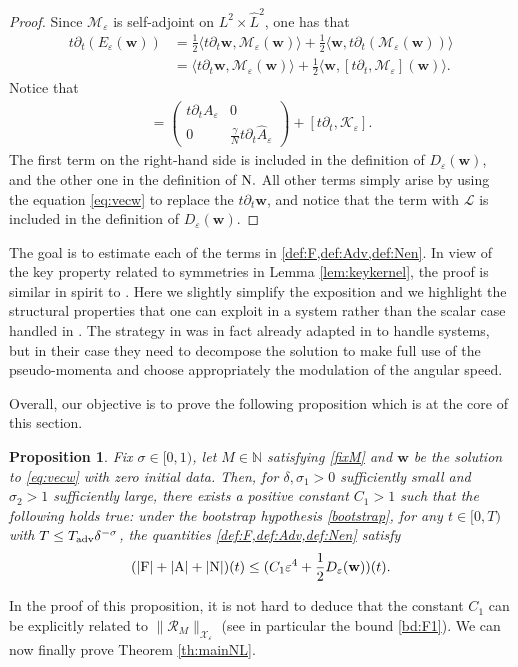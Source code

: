 \documentclass[11pt,reqno,a4paper]{amsart}
\def\eps{\varepsilon}
\def\de{{\partial}}
\def\NN {\mathbb{N}}
\newcommand{\cK}{\mathcal{K}}
\newcommand{\cL}{\mathcal{L}}
\newcommand{\cM}{\mathcal{M}}
\newcommand{\cR}{\mathcal{R}}
\newcommand{\cX}{\mathcal{X}}
\newcommand{\1}{\mathbbm{1}}
\newtheorem{proposition}{Proposition}[section]
\theoremstyle{definition}
\theoremstyle{definition}
\numberwithin{equation}{section}
\begin{document}
\begin{proof}
    Since $\cM_{\eps}$ is self-adjoint on $L^2\times \widehat{L}^2$, one has that 
    \begin{align}
        t\de_t (E_{\eps}({\mathbf w}))&=\frac12\langle t\de_t{\mathbf w},\cM_{\eps}(\mathbf w)\rangle +\frac12\langle {\mathbf w},t\de_t(\cM_\eps({\mathbf w}))\rangle\\
        &=\langle t\de_t{\mathbf w},\cM_{\eps}(\mathbf w)\rangle +\frac12\langle {\mathbf w},[t\de_t,\cM_\eps]({\mathbf w})\rangle.
    \end{align}
Notice that 
\begin{align}
[t\de_t,\cM_{\eps}]=\begin{pmatrix}
        t\de_t A_\eps &0\\
        0 &\frac{\gamma}{N}t\de_t\widehat{A}_\eps
    \end{pmatrix}+ [t\de_t,\cK_{\eps}].
\end{align}
The first term on the right-hand side is included in the definition of $D_{\eps}({\mathbf w})$, and the other one in the definition of ${\rm N}.$ All other terms simply arise by using the equation \cref{eq:vecw} to replace the $t\de_t{\mathbf w}$, and notice that the term with $\cL$ is included in the definition of $D_{\eps}({\mathbf w}).$
 \end{proof}
The goal is to estimate each of the terms in \cref{def:F,def:Adv,def:Nen}. In view of the key property related to symmetries in Lemma \ref{lem:keykernel}, the proof is similar in spirit to \cite{dolce2024long}. Here we slightly simplify the exposition and we highlight the structural properties that one can exploit in a system rather than the scalar case handled in \cite{dolce2024long}. The  strategy in \cite{dolce2024long} was in fact already adapted in \cite{zhang2025long} to handle systems, but in their case they need to decompose the solution to make full use of the pseudo-momenta and choose appropriately the modulation of the angular speed.

Overall, our objective is to prove the following proposition which is at the core of this section.
\begin{proposition}
\label{prop:FAN}     Fix $\sigma\in [0,1)$, let $M\in \NN$ satisfying \cref{fixM} and ${\mathbf w}$ be the solution to \cref{eq:vecw} with zero initial data. Then, for $\delta,\sigma_1>0$ sufficiently small and $\sigma_2>1$ sufficiently large, there exists a positive constant $C_1>1$ such that the following holds true: under the bootstrap hypothesis \cref{bootstrap}, for any $t\in  [0,T)$ with $T\leq T_{\rm adv}\delta^{-\sigma}$, the quantities \cref{def:F,def:Adv,def:Nen} satisfy 
    \begin{align}
    \label{bd:FAN}
        (|{\rm F}|+|{\rm A}|+|{\rm N}|)(t)\leq (C_1\eps^4+\frac{1}{2}D_{\eps}({\mathbf w}))(t).
    \end{align}
\end{proposition}
In the proof of this proposition, it is not hard to deduce that the constant $C_1$ can be explicitly related to $\|\boldsymbol{\cR}_M\|_{\cX_\eps}$ (see in particular the bound \cref{bd:F1}). We can now finally prove Theorem \ref{th:mainNL}.
\end{document}
